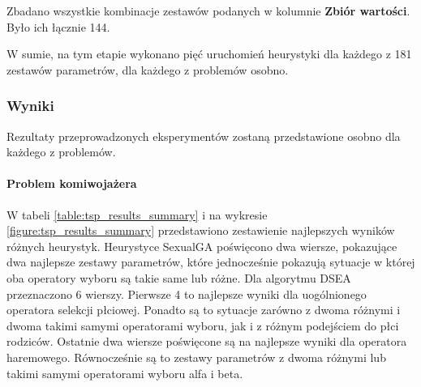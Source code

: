 \documentclass[./FM_mgr.tex]{subfiles}
\begin{document}

Zbadano wszystkie kombinacje zestawów podanych w kolumnie \textbf{Zbiór wartości}.
Było ich łącznie 144.

W sumie, na tym etapie wykonano pięć uruchomień heurystyki dla każdego z 181 zestawów parametrów, dla każdego z problemów osobno.

\subsubsection*{Wyniki}

Rezultaty przeprowadzonych eksperymentów zostaną przedstawione osobno dla każdego z problemów.

\paragraph{Problem komiwojażera}

W tabeli \ref{table:tsp_results_summary} i na wykresie \ref{figure:tsp_results_summary} przedstawiono zestawienie najlepszych wyników różnych heurystyk.
Heurystyce SexualGA poświęcono dwa wiersze, pokazujące dwa najlepsze zestawy parametrów, które jednocześnie pokazują sytuacje w której oba operatory wyboru są takie same lub różne.
Dla algorytmu DSEA przeznaczono 6 wierszy. 
Pierwsze 4 to najlepsze wyniki dla uogólnionego operatora selekcji płciowej.
Ponadto są to sytuacje zarówno z dwoma różnymi i dwoma takimi samymi operatorami wyboru, jak i z różnym podejściem do płci rodziców.
Ostatnie dwa wiersze poświęcone są na najlepsze wyniki dla operatora haremowego.
Równocześnie są to zestawy parametrów z dwoma różnymi lub takimi samymi operatorami wyboru alfa i beta.

\newpage
\end{document}
